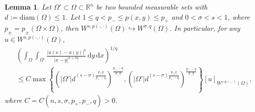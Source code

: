 \documentclass[11pt]{amsart}
\theoremstyle{plain}
\newtheorem{lemma}[theorem]{Lemma}
\theoremstyle{definition}
\numberwithin{equation}{section}
\begin{document}
\begin{lemma} \label{lem:embedding}
Let $\Omega' \subset \Omega \subset \mathbb{R}^n$ be two bounded measurable sets with $d:= \mathrm{diam}(\Omega) \leq 1$. Let $1 \leq q < p_- \leq p(x,y) \leq p_+$ and $0<\sigma < s <1$, where $p_\pm = p_\pm(\Omega \times \Omega)$, then $W^{s, p(\cdot,\cdot)}(\Omega) \hookrightarrow W^{\sigma, q}(\Omega)$. In particular, for any $u \in W^{s, p(\cdot, \cdot)}(\Omega)$,
\begin{equation*}
\begin{split}
&\left( \int_{\Omega} \int_{\Omega'} \frac{|u(x)-u(y)|^q}{|x-y|^{n+\sigma q}} \,\mathrm{d}y \,\mathrm{d}x \right)^{1/q} \\
&\leq C \max \left\lbrace \left( |\Omega'| d^{(s-\sigma) \frac{p_+ q}{p_+-q}} \right)^{\frac{p_+-q}{p_+q}}, \left( |\Omega'| d^{(s-\sigma) \frac{p_+ q}{p_+-q}} \right)^{\frac{p_--q}{p_-q}} \right \rbrace [u]_{W^{s,p(\cdot, \cdot)}(\Omega)},
\end{split}
\end{equation*}
where $C = C(n, s, \sigma, p_+, p_-, q) > 0$.
\end{lemma}
\end{document}
